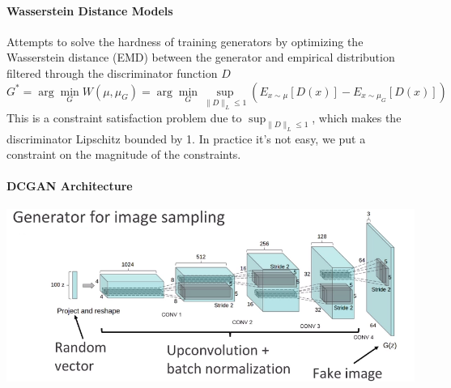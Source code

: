 \documentclass[10pt]{report}
\begin{document}
\paragraph{Wasserstein Distance Models} Attempts to solve the hardness of training generators by optimizing the Wasserstein distance (EMD) between the generator and empirical distribution filtered through the discriminator function $D$
$$G^* = \arg\min_G W(\mu,\mu_G) = \arg\min_G\sup_{\|D\|_L\leq 1}(E_{x\sim\mu}[D(x)]-E_{x\sim\mu_G}[D(x)])$$
This is a constraint satisfaction problem due to $\sup_{\|D\|_L\leq 1}$, which makes the discriminator Lipschitz bounded by 1. In practice it's not easy, we put a constraint on the magnitude of the constraints.
\paragraph{DCGAN Architecture}
\begin{center}
	\includegraphics[scale=0.5]{149.png}
\end{center}
\end{document}
